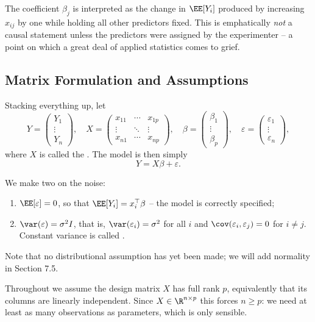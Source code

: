 The coefficient $\beta_j$ is interpreted as the change in $\EE[Y_i]$ produced by increasing $x_{ij}$ by one while holding all other predictors fixed. This is emphatically \emph{not} a causal statement unless the predictors were assigned by the experimenter -- a point on which a great deal of applied statistics comes to grief.

\subsection{Matrix Formulation and Assumptions}

Stacking everything up, let
$$
Y = \begin{pmatrix}Y_1\\\vdots\\Y_n\end{pmatrix},\quad
X = \begin{pmatrix}x_{11}&\cdots&x_{1p}\\\vdots&\ddots&\vdots\\x_{n1}&\cdots&x_{np}\end{pmatrix},\quad
\beta = \begin{pmatrix}\beta_1\\\vdots\\\beta_p\end{pmatrix},\quad
\varepsilon = \begin{pmatrix}\varepsilon_1\\\vdots\\\varepsilon_n\end{pmatrix},
$$
where $X$ is called the . The model is then simply
$$
Y = X\beta + \varepsilon.
$$

We make two  on the noise:
\begin{enumerate}[label=(\roman*)]
  \item $\EE[\varepsilon] = 0$, so that $\EE[Y_i] = x_i^\top\beta$ -- the model is correctly specified;
  \item $\var(\varepsilon) = \sigma^2 I$, that is, $\var(\varepsilon_i) = \sigma^2$ for all $i$ and $\cov(\varepsilon_i,\varepsilon_j) = 0$ for $i\neq j$. Constant variance is called .
\end{enumerate}
Note that no distributional assumption has yet been made; we will add normality in Section 7.5.

Throughout we assume the design matrix $X$ has full rank $p$, equivalently that its columns are linearly independent. Since $X \in \R^{n\times p}$ this forces $n \geq p$: we need at least as many observations as parameters, which is only sensible.

